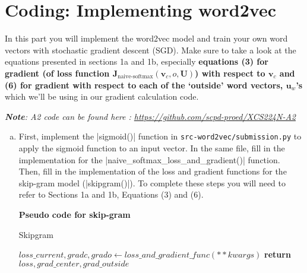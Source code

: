 \section{Coding: Implementing word2vec}
In this part you will implement the word2vec model and train your own word vectors with stochastic gradient descent (SGD). Make sure to take a look at the equations presented in sections 1a and 1b, especially \textbf{equations (3) for gradient (of loss function $\bm J_{\text{naive-softmax}}(\bm v_c, o, \bm U)$) with respect to $\bm v_c$ and (6) for gradient with respect to each of the `outside' word vectors, $\bm u_w$'s} which we'll be using in our gradient calculation code. 

\textit{\textbf{Note}: A2 code can be found here : \url{https://github.com/scpd-proed/XCS224N-A2}}

\begin{enumerate}[(a)]
    \item {} First, implement the |sigmoid()| function in \texttt{src-word2vec/submission.py} to apply the sigmoid function to an input vector. In the same file, fill in the implementation for the |naive_softmax_loss_and_gradient()| function. Then, fill in the implementation of the loss and gradient functions for the skip-gram model (|skipgram()|).\newline
    To complete these steps you will need to refer to Sections 1a and 1b, Equations (3) and (6).\newline
    
    \textbf{Pseudo code for skip-gram}
    
    \begin{algorithm}
    \caption{Skipgram}
    \begin{algorithmic}
        
        
            \State $loss\_current, gradc, grado \gets loss\_and\_gradient\_func(**kwargs)$
                    \EndFor
    \State \textbf{return} $loss, grad\_center, grad\_outside$\EndProcedure
    \end{algorithmic}
    \end{algorithm}


\end{enumerate}
